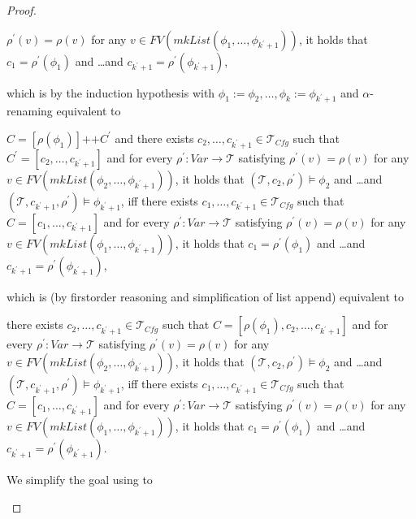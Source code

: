 \documentclass{article}
\newcommand{\Tcfg}{\mathcal{T}_{\mathit{Cfg}}}
\newenvironment{proofenv}
  {
    \VerbatimEnvironment\begin{tcolorbox}[colback=black!0!white] %
  }
  {
   \end{tcolorbox}
  }
\begin{document}
\begin{proof}
\begin{itemize}
\begin{proofenv}
    $\rho^\prime(v) = \rho(v)$ for any
    $v \in \mathit{FV}(\mathit{mkList}(\phi_1, \ldots, \phi_{k^\prime + 1}))$,
    it holds that
    $c_1 = \rho^\prime(\phi_1)$ and \ldots and $c_{k^\prime + 1} = \rho^\prime(\phi_{k^\prime + 1})$,
    \end{proofenv}
    which is by the induction hypothesis with $\phi_1 := \phi_2,\ldots,\phi_k := \phi_{k^\prime + 1}$
    and $\alpha$-renaming
    equivalent to
    \begin{proofenv}
    $C = [\rho(\phi_1)] \texttt{++} C^\prime$ and
    there exists $c_2, \ldots, c_{k^\prime + 1} \in \Tcfg$ such that $C^\prime = [c_2, \ldots, c_{k^\prime+1}]$ 
    and for every $\rho^\prime : \mathit{Var} \to \mathcal{T}$ satisfying
    $\rho^\prime(v) = \rho(v)$ for any
    $v \in \mathit{FV}(\mathit{mkList}(\phi_2, \ldots, \phi_{k^\prime+1}))$,
    it holds that
    $(\mathcal{T}, c_2, \rho^\prime) \vDash \phi_2$ and \ldots and $(\mathcal{T}, c_{k^\prime+1}, \rho^\prime) \vDash \phi_{k^\prime + 1}$,
    iff there exists $c_1, \ldots, c_{k^\prime + 1} \in \Tcfg$ such that $C = [c_1, \ldots, c_{k^\prime + 1}]$
    and for every $\rho^\prime : \mathit{Var} \to \mathcal{T}$ satisfying
    $\rho^\prime(v) = \rho(v)$ for any
    $v \in \mathit{FV}(\mathit{mkList}(\phi_1, \ldots, \phi_{k^\prime + 1}))$,
    it holds that
    $c_1 = \rho^\prime(\phi_1)$ and \ldots and $c_{k^\prime + 1} = \rho^\prime(\phi_{k^\prime + 1})$,
    \end{proofenv}
    which is (by firstorder reasoning and simplification of list append) equivalent to
    \begin{proofenv}
    there exists $c_2, \ldots, c_{k^\prime + 1} \in \Tcfg$ such that
    $C = [\rho(\phi_1), c_2, \ldots, c_{k^\prime+1}]$
    and for every $\rho^\prime : \mathit{Var} \to \mathcal{T}$ satisfying
    $\rho^\prime(v) = \rho(v)$ for any
    $v \in \mathit{FV}(\mathit{mkList}(\phi_2, \ldots, \phi_{k^\prime+1}))$,
    it holds that
    $(\mathcal{T}, c_2, \rho^\prime) \vDash \phi_2$ and \ldots and $(\mathcal{T}, c_{k^\prime+1}, \rho^\prime) \vDash \phi_{k^\prime+1}$,
    iff there exists $c_1, \ldots, c_{k^\prime + 1} \in \Tcfg$ such that $C = [c_1, \ldots, c_{k^\prime + 1}]$
    and for every $\rho^\prime : \mathit{Var} \to \mathcal{T}$ satisfying
    $\rho^\prime(v) = \rho(v)$ for any
    $v \in \mathit{FV}(\mathit{mkList}(\phi_1, \ldots, \phi_{k^\prime + 1}))$,
    it holds that
    $c_1 = \rho^\prime(\phi_1)$ and \ldots and $c_{k^\prime + 1} = \rho^\prime(\phi_{k^\prime + 1})$.
    \end{proofenv}
    We simplify the goal using  to

\end{itemize}
\end{proof}
\end{document}
